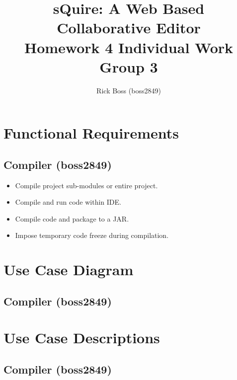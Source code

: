 \documentclass[11pt]{article}
\title{sQuire: A Web Based Collaborative Editor\\Homework 4 Individual Work\\Group 3}
\author{Rick Boss (boss2849)}
\begin{document}
\maketitle

\newpage
\tableofcontents
\newpage

\section{Functional Requirements}
    \subsection{Compiler (boss2849)}
        \begin{itemize}
            \item Compile project sub-modules or entire project.
            \item Compile and run code within IDE.
            \item Compile code and package to a JAR.
            \item Impose temporary code freeze during compilation.
        \end{itemize}

\section{Use Case Diagram}
\subsection{Compiler (boss2849)}

\section{Use Case Descriptions}
\subsection{Compiler (boss2849)}
\end{document}
